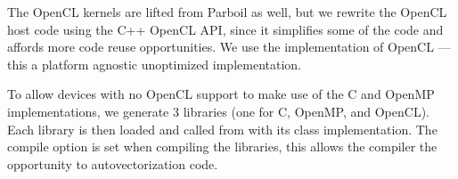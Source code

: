 The OpenCL kernels are lifted from Parboil as well, but we rewrite the 
	OpenCL host code using the C++ OpenCL API, since it simplifies some of the
	code and affords more code reuse opportunities.
We use the  implementation of OpenCL --- this a
platform agnostic unoptimized implementation.

To allow devices with no OpenCL support to make use of the C and OpenMP
implementations, we generate 3 libraries (one for C, OpenMP, and OpenCL).  Each
library is then loaded and called from with its class implementation.
The 
 compile option  is set when compiling the libraries, this allows the compiler the opportunity to autovectorization code.
